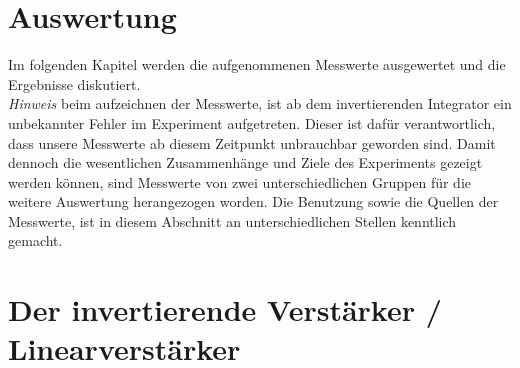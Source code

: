 \newpage
\section{Auswertung}
Im folgenden Kapitel werden die aufgenommenen Messwerte ausgewertet und die Ergebnisse 
diskutiert.\\
\textit{Hinweis} beim aufzeichnen der Messwerte, ist ab dem invertierenden Integrator
ein unbekannter Fehler im Experiment aufgetreten. Dieser ist dafür verantwortlich, dass
unsere Messwerte ab diesem Zeitpunkt unbrauchbar geworden sind.
Damit dennoch die wesentlichen Zusammenhänge und Ziele des Experiments gezeigt werden können,
sind Messwerte von zwei unterschiedlichen Gruppen für die weitere Auswertung herangezogen worden.
Die Benutzung sowie die Quellen der Messwerte,
ist in diesem Abschnitt an unterschiedlichen Stellen kenntlich gemacht.

\section{Der invertierende Verstärker / Linearverstärker}
